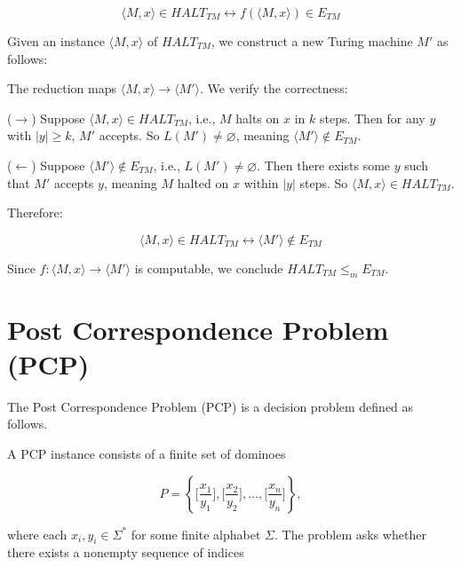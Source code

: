 \documentclass[12pt,a4paper,openany]{article}
\begin{document}
\[
\langle M, x\rangle \in HALT_{TM} \leftrightarrow f(\langle M, x\rangle) \in E_{TM}
\]

\noindent Given an instance $\langle M, x\rangle$ of $HALT_{TM}$, we construct a new Turing machine $M'$ as follows:

\bigskip

\begin{center}
\end{center}

The reduction maps $\langle M, x\rangle \to \langle M' \rangle$. We verify the correctness:

($\to$) Suppose $\langle M, x\rangle \in HALT_{TM}$, i.e., $M$ halts on $x$ in $k$ steps. Then for any $y$ with $|y| \geq k$, $M'$ accepts. So $L(M') \neq \varnothing$, meaning $\langle M' \rangle \notin E_{TM}$.

($\leftarrow$) Suppose $\langle M' \rangle \notin E_{TM}$, i.e., $L(M') \neq \varnothing$. Then there exists some $y$ such that $M'$ accepts $y$, meaning $M$ halted on $x$ within $|y|$ steps. So $\langle M, x\rangle \in HALT_{TM}$.

Therefore:

\[
\langle M, x\rangle \in HALT_{TM} \leftrightarrow \langle M' \rangle \notin E_{TM}
\]

Since $f : \langle M, x\rangle \to \langle M' \rangle$ is computable, we conclude $HALT_{TM} \leq_m E_{TM}$.

\section{Post Correspondence Problem (PCP)}

The Post Correspondence Problem (PCP) is a decision problem defined as follows.

A PCP instance consists of a finite set of dominoes

\[
P = \left\{ \bigg[\frac{x_1}{y_1}\bigg], \bigg[\frac{x_2}{y_2}\bigg], \ldots, \bigg[\frac{x_n}{y_n}\bigg] \right\},
\]

where each $x_i, y_i \in \Sigma^*$ for some finite alphabet $\Sigma$. The problem asks whether there exists a nonempty sequence of indices
\end{document}
